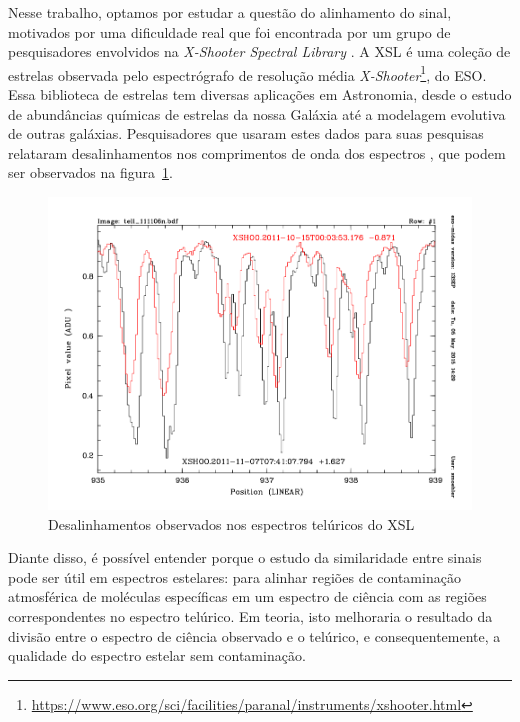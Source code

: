 Nesse trabalho, optamos por estudar a questão do alinhamento do sinal, motivados por uma dificuldade real que foi encontrada por um grupo de pesquisadores envolvidos na \textit{X-Shooter Spectral Library} \citep[][XSL]{Chen2014TheXS}. A XSL é uma coleção de estrelas observada pelo espectrógrafo de resolução média \textit{X-Shooter}\footnote{\url{https://www.eso.org/sci/facilities/paranal/instruments/xshooter.html}}, do ESO. Essa biblioteca de estrelas tem diversas aplicações em Astronomia, desde o estudo de abundâncias químicas de estrelas da nossa Galáxia até a modelagem evolutiva de outras galáxias. Pesquisadores que usaram estes dados para suas pesquisas relataram desalinhamentos nos comprimentos de onda dos espectros \citep{unpublished-xshooter-data-release, wavelength-shifts}, que podem ser observados na figura~\ref{fig:observed-wavelength-shifts}.

\begin{figure}[htb]
\centering
\includegraphics[width=12cm]{figuras/xsl-wavelength-shifts.png}
\caption{Desalinhamentos observados nos espectros telúricos do XSL \citep{wavelength-shifts}}
\label{fig:observed-wavelength-shifts}
\end{figure}

Diante disso, é possível entender porque o estudo da similaridade entre sinais pode ser útil em espectros estelares: para alinhar regiões de contaminação atmosférica de moléculas específicas em um espectro de ciência com as regiões correspondentes no espectro telúrico. Em teoria, isto melhoraria o resultado da divisão entre o espectro de ciência observado e o telúrico, e consequentemente, a qualidade do espectro estelar sem contaminação.

